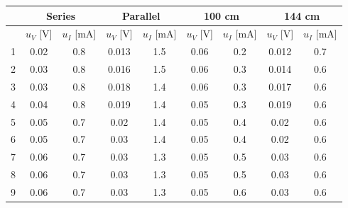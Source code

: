 \documentclass[a4paper]{article}
\begin{document}
\begin{table}[H]
	\centering
	\begin{tabular}{c|cc||cc||cc||cc}
		\hline
		   & \multicolumn{2}{c||}{Series} & \multicolumn{2}{c||}{Parallel} & \multicolumn{2}{c||}{100 cm} & \multicolumn{2}{c}{144 cm}                                                   \\
		\hline
		   & $u_V$ [V]                    & $u_I$ [mA]                     & $u_V$ [V]                    & $u_I$ [mA]                 & $u_V$ [V] & $u_I$ [mA] & $u_V$ [V] & $u_I$ [mA] \\
		\hline
		1  & 0.02                         & 0.8                            & 0.013                        & 1.5                        & 0.06      & 0.2        & 0.012     & 0.7        \\
		2  & 0.03                         & 0.8                            & 0.016                        & 1.5                        & 0.06      & 0.3        & 0.014     & 0.6        \\
		3  & 0.03                         & 0.8                            & 0.018                        & 1.4                        & 0.06      & 0.3        & 0.017     & 0.6        \\
		4  & 0.04                         & 0.8                            & 0.019                        & 1.4                        & 0.05      & 0.3        & 0.019     & 0.6        \\
		5  & 0.05                         & 0.7                            & 0.02                         & 1.4                        & 0.05      & 0.4        & 0.02      & 0.6        \\
		6  & 0.05                         & 0.7                            & 0.03                         & 1.4                        & 0.05      & 0.4        & 0.02      & 0.6        \\
		7  & 0.06                         & 0.7                            & 0.03                         & 1.3                        & 0.05      & 0.5        & 0.03      & 0.6        \\
		8  & 0.06                         & 0.7                            & 0.03                         & 1.3                        & 0.05      & 0.5        & 0.03      & 0.6        \\
		9  & 0.06                         & 0.7                            & 0.03                         & 1.3                        & 0.05      & 0.6        & 0.03      & 0.6        \\

\end{tabular}
\end{table}
\end{document}
